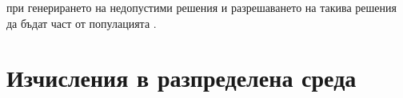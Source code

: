 при генерирането на недопустими решения и разрешаването на такива решения да бъдат част от популацията \cite{Lagaros-01}.

\section{Изчисления в разпределена среда}


